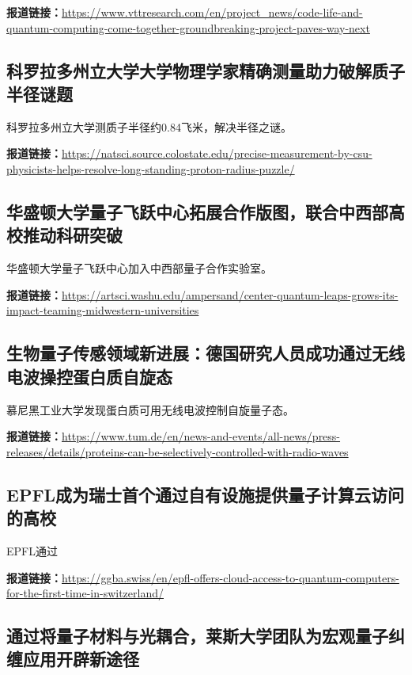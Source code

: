 \documentclass[12pt,a4paper]{ctexart}
\begin{document}
\noindent\textbf{报道链接：}\url{https://www.vttresearch.com/en/project\_news/code-life-and-quantum-computing-come-together-groundbreaking-project-paves-way-next}

\subsection{ 科罗拉多州立大学大学物理学家精确测量助力破解质子半径谜题 }

科罗拉多州立大学测质子半径约0.84飞米，解决半径之谜。

\noindent\textbf{报道链接：}\url{https://natsci.source.colostate.edu/precise-measurement-by-csu-physicists-helps-resolve-long-standing-proton-radius-puzzle/}

\subsection{ 华盛顿大学量子飞跃中心拓展合作版图，联合中西部高校推动科研突破 }

华盛顿大学量子飞跃中心加入中西部量子合作实验室。

\noindent\textbf{报道链接：}\url{https://artsci.washu.edu/ampersand/center-quantum-leaps-grows-its-impact-teaming-midwestern-universities}

\subsection{ 生物量子传感领域新进展：德国研究人员成功通过无线电波操控蛋白质自旋态 }

慕尼黑工业大学发现蛋白质可用无线电波控制自旋量子态。

\noindent\textbf{报道链接：}\url{https://www.tum.de/en/news-and-events/all-news/press-releases/details/proteins-can-be-selectively-controlled-with-radio-waves}

\subsection{ EPFL成为瑞士首个通过自有设施提供量子计算云访问的高校 }

EPFL通过

\noindent\textbf{报道链接：}\url{https://ggba.swiss/en/epfl-offers-cloud-access-to-quantum-computers-for-the-first-time-in-switzerland/}

\subsection{ 通过将量子材料与光耦合，莱斯大学团队为宏观量子纠缠应用开辟新途径 }
\end{document}
